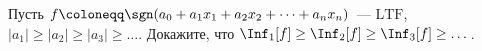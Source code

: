 Пусть $f \coloneqq \sgn(a_0 + a_1 x_1 + a_2 x_2 + \dots + a_n x_n)$~--- $\mathrm{LTF}$, $|a_1| \ge |a_2|
\ge |a_3| \ge \dots$. Докажите, что $\Inf_1[f] \ge \Inf_2[f] \ge \Inf_3[f] \ge \dots$.